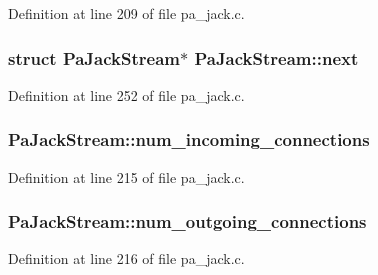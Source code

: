 Definition at line 209 of file pa\+\_\+jack.\+c.

\subsubsection[{\texorpdfstring{next}{next}}]{\setlength{\rightskip}{0pt plus 5cm}struct {\bf Pa\+Jack\+Stream}$\ast$ Pa\+Jack\+Stream\+::next}\hypertarget{struct_pa_jack_stream_a3a2e2f3009c7c00d29b245b93e426cb0}{}\label{struct_pa_jack_stream_a3a2e2f3009c7c00d29b245b93e426cb0}


Definition at line 252 of file pa\+\_\+jack.\+c.

\subsubsection[{\texorpdfstring{num\+\_\+incoming\+\_\+connections}{num_incoming_connections}}]{ Pa\+Jack\+Stream\+::num\+\_\+incoming\+\_\+connections}\hypertarget{struct_pa_jack_stream_aafb405d93ffbd1c1c6c351c66ceef7ad}{}\label{struct_pa_jack_stream_aafb405d93ffbd1c1c6c351c66ceef7ad}


Definition at line 215 of file pa\+\_\+jack.\+c.

\subsubsection[{\texorpdfstring{num\+\_\+outgoing\+\_\+connections}{num_outgoing_connections}}]{ Pa\+Jack\+Stream\+::num\+\_\+outgoing\+\_\+connections}\hypertarget{struct_pa_jack_stream_a6fc39840c852acfbc486cfee93b96446}{}\label{struct_pa_jack_stream_a6fc39840c852acfbc486cfee93b96446}


Definition at line 216 of file pa\+\_\+jack.\+c.

